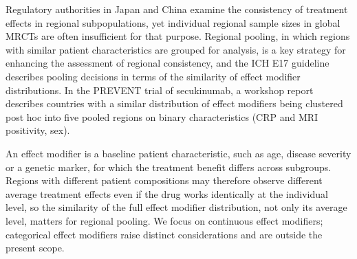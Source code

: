 \documentclass[AMA,Times1COL]{WileyNJDv5}
\begin{document}
Regulatory authorities in Japan and China examine the consistency of treatment effects in regional subpopulations,\cite{matsushima2024,song2025} yet individual regional sample sizes in global MRCTs are often insufficient for that purpose. Regional pooling, in which regions with similar patient characteristics are grouped for analysis, is a key strategy for enhancing the assessment of regional consistency, and the ICH E17 guideline describes pooling decisions in terms of the similarity of effect modifier distributions.\cite{iche17} In the PREVENT trial of secukinumab, a workshop report describes countries with a similar distribution of effect modifiers being clustered post hoc into five pooled regions on binary characteristics (CRP and MRI positivity, sex).\cite{matsushima2024}

An effect modifier is a baseline patient characteristic, such as age, disease severity or a genetic marker, for which the treatment benefit differs across subgroups. Regions with different patient compositions may therefore observe different average treatment effects even if the drug works identically at the individual level, so the similarity of the full effect modifier distribution, not only its average level, matters for regional pooling. We focus on continuous effect modifiers; categorical effect modifiers raise distinct considerations and are outside the present scope.

\end{document}
